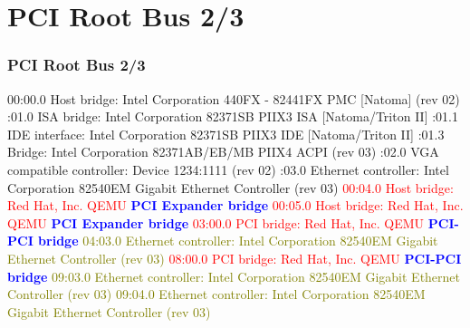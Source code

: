 \documentclass[aspectratio=169]{beamer}
\begin{document}
\section{PCI Root Bus 2/3}
\begin{frame}
\frametitle{PCI Root Bus 2/3}
\begin{block}{}
00:00.0 Host bridge: Intel Corporation 440FX - 82441FX PMC [Natoma] (rev 02) :01.0 ISA bridge: Intel Corporation 82371SB PIIX3 ISA [Natoma/Triton II] :01.1 IDE interface: Intel Corporation 82371SB PIIX3 IDE [Natoma/Triton II] :01.3 Bridge: Intel Corporation 82371AB/EB/MB PIIX4 ACPI (rev 03) :02.0 VGA compatible controller: Device 1234:1111 (rev 02) :03.0 Ethernet controller: Intel Corporation 82540EM Gigabit Ethernet Controller (rev 03) \newline
\textcolor{red}{00:04.0 Host bridge: Red Hat, Inc. QEMU \textbf{\textcolor{blue}{PCI Expander bridge}}} \newline
\textcolor{red}{00:05.0 Host bridge: Red Hat, Inc. QEMU \textbf{\textcolor{blue}{PCI Expander bridge}}} \newline
\textcolor{red}{03:00.0 PCI bridge: Red Hat, Inc. QEMU \textbf{\textcolor{blue}{PCI-PCI bridge}}} \newline
\textcolor{olive}{04:03.0 Ethernet controller: Intel Corporation 82540EM Gigabit Ethernet Controller (rev 03)} \newline
\textcolor{red}{08:00.0 PCI bridge: Red Hat, Inc. QEMU \textbf{\textcolor{blue}{PCI-PCI bridge}}} \newline
\textcolor{olive}{09:03.0 Ethernet controller: Intel Corporation 82540EM Gigabit Ethernet Controller (rev 03)} \newline
\textcolor{olive}{09:04.0 Ethernet controller: Intel Corporation 82540EM Gigabit Ethernet Controller (rev 03)}
\end{block}
\end{frame}

\end{document}
